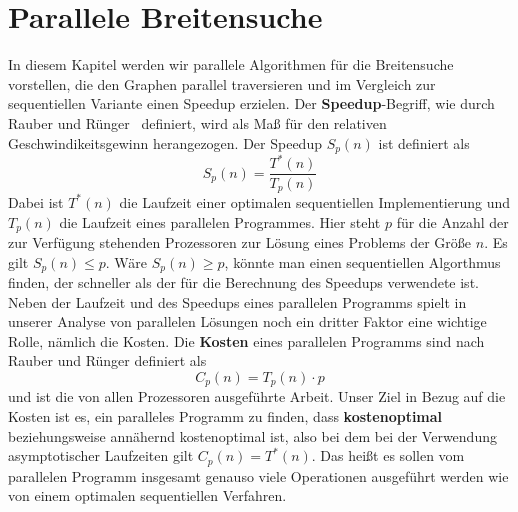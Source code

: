 \documentclass[11pt,a4paper]{article}
\begin{document}
\section{Parallele Breitensuche}
\label{parallel}
In diesem Kapitel werden wir parallele Algorithmen für die Breitensuche vorstellen, die den Graphen parallel traversieren und im Vergleich zur sequentiellen Variante einen Speedup erzielen. Der \textbf{Speedup}-Begriff, wie durch Rauber und Rünger~\cite{rauber} definiert, wird als Maß für den relativen Geschwindikeitsgewinn herangezogen. Der Speedup \(S_{p}(n)\) ist definiert als
\begin{equation}
	S_{p}(n) = \frac{T^{*}(n)}{T_{p}(n)}
\end{equation}
Dabei ist \(T^{*}(n)\) die Laufzeit einer optimalen sequentiellen Implementierung und \(T_{p}(n) \) die Laufzeit eines parallelen Programmes. Hier steht \(p\) für die Anzahl der zur Verfügung stehenden Prozessoren zur Lösung eines Problems der Größe \(n\). Es gilt \(S_{p}(n) \leq p\). Wäre \(S_{p}(n) \geq p\), könnte man einen sequentiellen Algorthmus finden, der schneller als der für die Berechnung des Speedups verwendete ist.\\
Neben der Laufzeit und des Speedups eines parallelen Programms spielt in unserer Analyse von parallelen Lösungen noch ein dritter Faktor eine wichtige Rolle, nämlich die Kosten. Die \textbf{Kosten} eines parallelen Programms sind nach Rauber und Rünger \cite{rauber} definiert als
\begin{equation}
	C_{p}(n) = T_{p}(n) \cdot p
 \end{equation}
und ist die von allen Prozessoren ausgeführte Arbeit. Unser Ziel in Bezug auf die Kosten ist es, ein paralleles Programm zu finden, dass \textbf{kostenoptimal} beziehungsweise annähernd kostenoptimal ist, also bei dem bei der Verwendung asymptotischer Laufzeiten gilt \(C_{p}(n) = T^{*}(n)\). Das heißt es sollen vom parallelen Programm insgesamt genauso viele Operationen ausgeführt werden wie von einem optimalen sequentiellen Verfahren.
\end{document}
